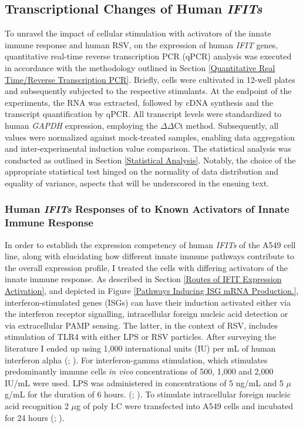 \subsection{Transcriptional Changes of Human \textit{IFITs}} \label{Transcriptional Changes of Human IFITs}
To unravel the impact of cellular stimulation with activators of the innate immune response and human RSV, on the expression of human \textit{IFIT} genes, quantitative real-time reverse transcription PCR (qPCR) analysis was executed in accordance with the methodology outlined in Section \ref{Quantitative Real Time/Reverse Transcription PCR}. Briefly, cells were cultivated in 12-well plates and subsequently subjected to the respective stimulants. At the endpoint of the experiments, the RNA was extracted, followed by cDNA synthesis and the transcript quantification by qPCR. All transcript levels were standardized to human \textit{GAPDH} expression, employing  the 
\(\Delta\)\(\Delta\)Ct method. Subsequently, all values were normalized against mock-treated samples, enabling data aggregation and inter-experimental induction value comparison. The statistical analysis was conducted as outlined in Section \ref{Statistical Analysis}. Notably, the choice of the appropriate statistical test hinged on the normality of data distribution and equality of variance, aspects that will be underscored in the ensuing text.



\subsubsection{Human \textit{IFITs} Responses of to Known Activators of Innate Immune Response} \label{Human IFIT Responses to Known Activators of Innate Immune Response}
In order to establish the expression competency of human \textit{IFITs} of the A549 cell line, along with elucidating how different innate immune pathways contribute to the overall expression profile, I treated the cells with differing activators of the innate immune response. As described in Section \ref{Routes of IFIT Expression Activation}, and depicted in Figure \ref{Pathways Inducing ISG mRNA Production.},  interferon-stimulated genes (ISGs) can have their induction activated either via the interferon receptor signalling, intracellular foreign nucleic acid detection or via extracellular PAMP sensing. The latter, in the context of RSV, includes stimulation of TLR4 with either LPS or RSV particles. After surveying the literature I ended up using 1,000 international units (IU) per mL of human interferon alpha (\cite{Terenzi2006DistinctISG56}; \cite{Santhakumar2018ChickenViruses}). For interferon-gamma stimulation, which stimulates predominantly immune cells \textit{in vivo} concentrations of 500, 1,000 and 2,000 IU/mL were used. LPS was administered in concentrations of 5 ng/mL and 5 \(\mu\)g/mL for the duration of 6 hours. (\cite{Mears2019Ifit1Cells}; \cite{Zhang2019GrouperResponse}). To stimulate intracellular foreign nucleic acid recognition 2 \(\mu\)g of poly I:C were transfected into A549 cells and incubated for 24 hours (\cite{Mears2019Ifit1Cells}; \cite{Palchetti2015TransfectedCells}).

